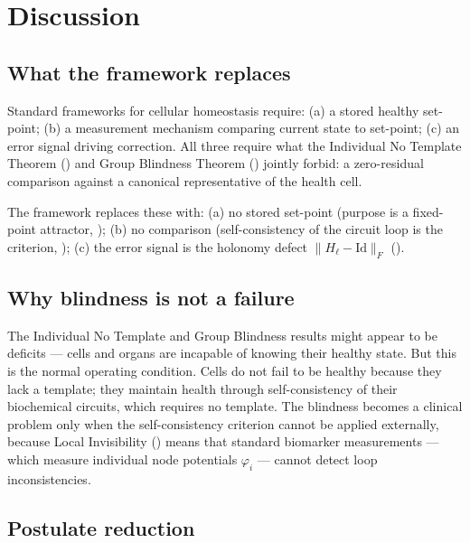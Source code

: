 \documentclass[twocolumn,11pt,a4paper]{article}
\newcommand{\HolL}{H_\ell}
\begin{document}
\section{Discussion}
\label{sec:discussion}

\subsection{What the framework replaces}

Standard frameworks for cellular homeostasis require:
(a) a stored healthy set-point; (b) a measurement mechanism comparing
current state to set-point; (c) an error signal driving correction.
All three require what the Individual No Template Theorem
() and Group Blindness Theorem
() jointly forbid: a zero-residual comparison
against a canonical representative of the health cell.

The framework replaces these with:
(a) no stored set-point (purpose is a fixed-point attractor,
); (b) no comparison (self-consistency of the circuit
loop is the criterion, ); (c) the error
signal is the holonomy defect $\|\HolL - \mathrm{Id}\|_F$
().

\subsection{Why blindness is not a failure}

The Individual No Template and Group Blindness results might appear to be
deficits --- cells and organs are incapable of knowing their healthy state.
But this is the normal operating condition. Cells do not fail to be
healthy because they lack a template; they maintain health through
self-consistency of their biochemical circuits, which requires no template.
The blindness becomes a clinical problem only when the self-consistency
criterion cannot be applied externally, because Local Invisibility
() means that standard biomarker measurements ---
which measure individual node potentials $\varphi_i$ --- cannot detect
loop inconsistencies.

\subsection{Postulate reduction}
\end{document}
